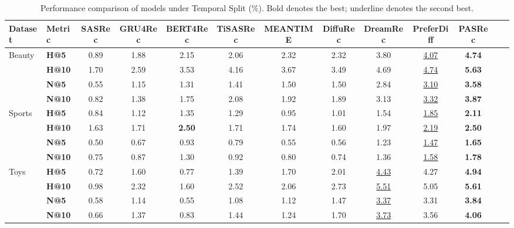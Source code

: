 \documentclass[sigconf,nonacm]{acmart}
\newcommand{\modelname}{PASRec}
\begin{document}
\begin{table}[htbp]
\centering
\small
\caption{Performance comparison of models under Temporal Split (\%). Bold denotes the best; underline denotes the second best.}
\label{tab:811_compare}
\begin{adjustbox}{max width=\textwidth}
\begin{tabular}{llccccccccccc}
\toprule
\textbf{Dataset} & \textbf{Metric} & \textbf{SASRec} & \textbf{GRU4Rec} & \textbf{BERT4Rec} & \textbf{TiSASRec} & \textbf{MEANTIME} & \textbf{DiffuRec} & \textbf{DreamRec} & \textbf{PreferDiff} & \textbf{\modelname}  \\
\midrule


\multirow{4}{*}{Beauty}

& \textbf{H@5}     & 0.89 & 1.88 & 2.15  & 2.06  & 2.32  & 2.32 & 3.80 & \underline{4.07} & \textbf{4.74} \\
& \textbf{H@10}    & 1.70 & 2.59 & 3.53  & 4.16  & 3.67  & 3.49 & 4.69 & \underline{4.74} & \textbf{5.63} \\
& \textbf{N@5}     & 0.55 & 1.15 & 1.31  & 1.41  & 1.50  & 1.50 & 2.84 & \underline{3.10} & \textbf{3.58} \\
& \textbf{N@10}    & 0.82 & 1.38 & 1.75  & 2.08  & 1.92  & 1.89 & 3.13 & \underline{3.32} & \textbf{3.87} \\

\midrule

\multirow{4}{*}{Sports}

& \textbf{H@5}     & 0.84 & 1.12 & 1.35 & 1.29 & 0.95 & 1.01 & 1.54 & \underline{1.85} & \textbf{2.11} \\
& \textbf{H@10}    & 1.63 & 1.71 & \textbf{2.50} & 1.71 & 1.74 & 1.60 & 1.97 & \underline{2.19} & \textbf{2.50} \\
& \textbf{N@5}     & 0.50 & 0.67 & 0.93 & 0.79 & 0.55 & 0.56 & 1.23 & \underline{1.47} & \textbf{1.65} \\
& \textbf{N@10}    & 0.75 & 0.87 & 1.30 & 0.92 & 0.80 & 0.74 & 1.36 & \underline{1.58} & \textbf{1.78} \\

\midrule

\multirow{4}{*}{Toys}

& \textbf{H@5}     & 0.72 & 1.60 & 0.77 & 1.39 & 1.70 & 2.01 & \underline{4.43} & 4.27 & \textbf{4.94} \\
& \textbf{H@10}    & 0.98 & 2.32 & 1.60 & 2.52 & 2.06 & 2.73 & \underline{5.51} & 5.05 & \textbf{5.61} \\
& \textbf{N@5}     & 0.58 & 1.14 & 0.55 & 1.08 & 1.12 & 1.47 & \underline{3.37} & 3.31 & \textbf{3.84} \\
& \textbf{N@10}    & 0.66 & 1.37 & 0.83 & 1.44 & 1.24 & 1.70 & \underline{3.73} & 3.56 & \textbf{4.06} \\


\end{tabular}
\end{adjustbox}
\end{table}
\end{document}
